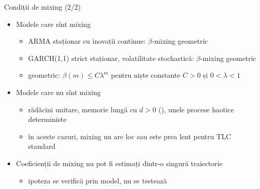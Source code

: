 \begin{frame}{Condiții de mixing (2/2)}
\itemsize{\small}
\begin{itemize}
    \item Modele care sînt mixing
    \begin{itemize}
        \item ARMA staționar cu inovații continue: $\beta$-mixing geometric 
        \item GARCH(1,1) strict staționar, volatilitate stochastică: $\beta$-mixing geometric 
        \item geometric: $\beta(m) \le C\lambda^m$ pentru niște constante $C > 0$ și $0 < \lambda < 1$
    \end{itemize}
    \item Modele care nu sînt mixing
    \begin{itemize}
        \item rădăcini unitare, memorie lungă cu $d > 0$ (), unele procese haotice deterministe
        \item în aceste cazuri, mixing nu are loc sau este prea lent pentru TLC standard
    \end{itemize}
    \item Coeficienții de mixing nu pot fi estimați dintr-o singură traiectorie
    \begin{itemize}
        \item ipoteza se verifică prin model, nu se testează
    \end{itemize}
\end{itemize}
\end{frame}


